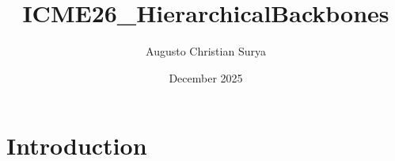 \documentclass{article}
\title{ICME26_HierarchicalBackbones}
\author{Augusto Christian Surya}
\date{December 2025}
\begin{document}
\maketitle

\section{Introduction}
\end{document}
